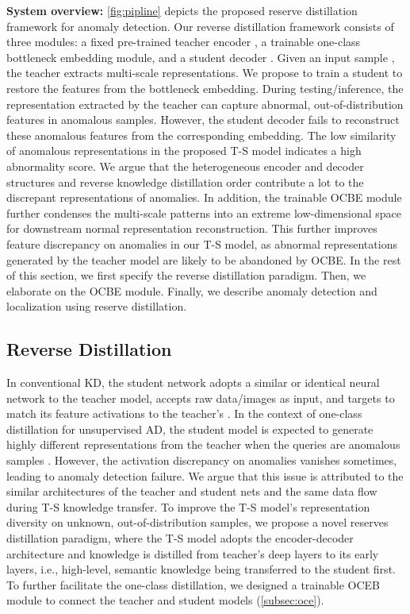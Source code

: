 \documentclass[10pt,twocolumn,letterpaper]{article}
\begin{document}
\textbf{System overview:} \cref{fig:pipline} depicts the proposed reserve distillation framework for anomaly detection. Our reverse distillation framework consists of three modules: a fixed pre-trained teacher encoder , a trainable one-class bottleneck embedding module, and a student decoder . Given an input sample , the teacher  extracts multi-scale representations. We propose to train a student  to restore the features from the bottleneck embedding. During testing/inference, the representation extracted by the teacher  can capture abnormal, out-of-distribution features in anomalous samples. However, the student decoder  fails to reconstruct these anomalous features from the corresponding embedding. The low similarity of anomalous representations in the proposed T-S model indicates a high abnormality score. We argue that the heterogeneous encoder and decoder structures and reverse knowledge distillation order contribute a lot to the discrepant representations of anomalies. In addition, the trainable OCBE module further condenses the multi-scale patterns into an extreme low-dimensional space for downstream normal representation reconstruction. This further improves feature discrepancy on anomalies in our T-S model, as abnormal representations generated by the teacher model are likely to be abandoned by OCBE.   In the rest of this section, we first specify the reverse distillation paradigm. Then, we elaborate on the OCBE module. Finally, we describe anomaly detection and localization using reserve distillation.

\subsection{Reverse Distillation}
\label{subsec:rd}

In conventional KD, the student network adopts a similar or identical neural network to the teacher model, accepts raw data/images as input, and targets to match its feature activations to the teacher's \cite{mkd,us}. In the context of one-class distillation for unsupervised AD, the student model is expected to generate highly different representations from the teacher when the queries are anomalous samples \cite{memae,mnad}. However, the activation discrepancy on anomalies vanishes sometimes, leading to anomaly detection failure. We argue that this issue is attributed to the similar architectures of the teacher and student nets and the same data flow during T-S knowledge transfer. To improve the T-S model's representation diversity on unknown, out-of-distribution samples, we propose a novel reserves distillation paradigm, where the T-S model adopts the encoder-decoder architecture and knowledge is distilled from teacher's deep layers to its early layers, i.e., high-level, semantic knowledge being transferred to the student first. To further facilitate the one-class distillation, we designed a trainable OCEB module to connect the teacher and student models (\cref{subsec:oce}).
\end{document}
